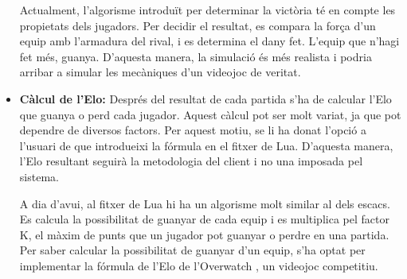 \documentclass[a4paper]{article}
\begin{document}
\begin{itemize}
    Actualment, l'algorisme introduït per determinar la victòria té en compte les propietats dels jugadors. Per decidir el resultat, es compara la força d'un equip amb l'armadura del rival, i es determina el dany fet. L'equip que n'hagi fet més, guanya. D'aquesta manera, la simulació és més realista i podria arribar a simular les mecàniques d'un videojoc de veritat.

    \item \textbf{Càlcul de l'Elo:} Després del resultat de cada partida s'ha de calcular l'Elo que guanya o perd cada jugador. Aquest càlcul pot ser molt variat, ja que pot dependre de diversos factors. Per aquest motiu, se li ha donat l'opció a l'usuari de que introdueixi la fórmula en el fitxer de Lua. D'aquesta manera, l'Elo resultant seguirà la metodologia del client i no una imposada pel sistema. 
    
    A dia d'avui, al fitxer de Lua hi ha un algorisme molt similar al dels escacs. Es calcula la possibilitat de guanyar de cada equip i es multiplica pel factor K, el màxim de punts que un jugador pot guanyar o perdre en una partida. Per saber calcular la possibilitat de guanyar d'un equip, s'ha optat per implementar la fórmula de l'Elo de l'Overwatch \cite{overwatchElo}, un videojoc competitiu.
\end{itemize}
\end{document}
